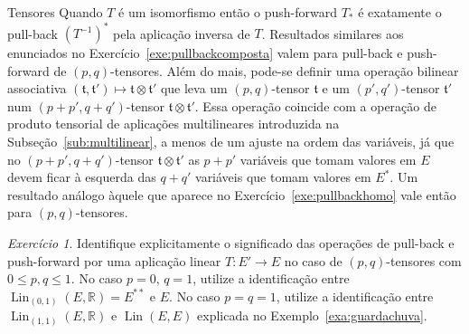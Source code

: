 \documentclass[oneside,11pt]{amsart}
\newcommand{\R}{\mathds R}
\DeclareMathOperator{\Lin}{Lin}
\theoremstyle{remark}\newtheorem{exercise}{Exercício}[section]
\theoremstyle{plain}\newtheorem{teo}{Teorema}[section]
\theoremstyle{plain}\newtheorem{lem}[teo]{Lema}
\theoremstyle{plain}\newtheorem{prop}[teo]{Proposição}
\theoremstyle{definition}\newtheorem{defin}[teo]{Definição}
\theoremstyle{remark}\newtheorem{rem}[teo]{Observação}
\theoremstyle{definition}\newtheorem{example}[teo]{Exemplo}
\numberwithin{equation}{section}
\begin{document}
\begin{section}{Tensores}
Quando $T$ é um isomorfismo então o push-forward $T_*$ é exatamente o pull-back $(T^{-1})^*$ pela aplicação inversa de $T$. Resultados
similares aos enunciados no Exercício~\ref{exe:pullbackcomposta} valem para pull-back e push-forward de $(p,q)$-tensores. Além do mais, pode-se
definir uma operação bilinear associativa $(\mathfrak t,\mathfrak t')\mapsto\mathfrak t\otimes\mathfrak t'$
que leva um $(p,q)$-tensor $\mathfrak t$ e um $(p',q')$-tensor $\mathfrak t'$ num $(p+p',q+q')$-tensor $\mathfrak t\otimes\mathfrak t'$. Essa operação
coincide com a operação de produto tensorial de aplicações multilineares introduzida na Subseção~\ref{sub:multilinear}, a menos de um ajuste na ordem das variáveis, já que
no $(p+p',q+q')$-tensor $\mathfrak t\otimes\mathfrak t'$ as $p+p'$ variáveis que tomam valores em $E$ devem ficar à esquerda das $q+q'$ variáveis que tomam
valores em $E^*$. Um resultado análogo àquele que aparece no Exercício~\ref{exe:pullbackhomo} vale então para $(p,q)$-tensores.

\begin{exercise}\label{exe:pullbackpqpartic}
Identifique explicitamente o significado das operações de pull-back e push-forward por uma aplicação linear $T:E'\to E$ no caso de $(p,q)$-tensores
com $0\le p,q\le1$. No caso $p=0$, $q=1$, utilize a identificação entre $\Lin_{(0,1)}(E,\R)=E^{**}$ e $E$. No caso $p=q=1$, utilize a
identificação entre $\Lin_{(1,1)}(E,\R)$ e $\Lin(E,E)$ explicada no Exemplo~\ref{exa:guardachuva}.
\end{exercise}


\end{section}
\end{document}
